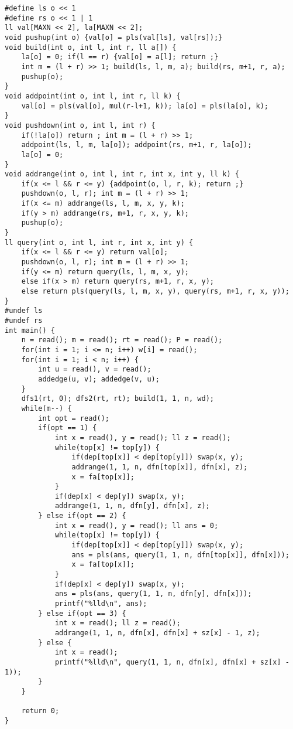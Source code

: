 \documentclass{article}
\begin{document}
\begin{lstlisting}
#define ls o << 1
#define rs o << 1 | 1
ll val[MAXN << 2], la[MAXN << 2];
void pushup(int o) {val[o] = pls(val[ls], val[rs]);}
void build(int o, int l, int r, ll a[]) {
	la[o] = 0; if(l == r) {val[o] = a[l]; return ;}
	int m = (l + r) >> 1; build(ls, l, m, a); build(rs, m+1, r, a);
	pushup(o);
}
void addpoint(int o, int l, int r, ll k) {
	val[o] = pls(val[o], mul(r-l+1, k)); la[o] = pls(la[o], k);
}
void pushdown(int o, int l, int r) {
	if(!la[o]) return ; int m = (l + r) >> 1;
	addpoint(ls, l, m, la[o]); addpoint(rs, m+1, r, la[o]);
	la[o] = 0;
}
void addrange(int o, int l, int r, int x, int y, ll k) {
	if(x <= l && r <= y) {addpoint(o, l, r, k); return ;}
	pushdown(o, l, r); int m = (l + r) >> 1;
	if(x <= m) addrange(ls, l, m, x, y, k);
	if(y > m) addrange(rs, m+1, r, x, y, k);
	pushup(o);
}
ll query(int o, int l, int r, int x, int y) {
	if(x <= l && r <= y) return val[o];
	pushdown(o, l, r); int m = (l + r) >> 1;
	if(y <= m) return query(ls, l, m, x, y);
	else if(x > m) return query(rs, m+1, r, x, y);
	else return pls(query(ls, l, m, x, y), query(rs, m+1, r, x, y));
}
#undef ls
#undef rs
int main() {
	n = read(); m = read(); rt = read(); P = read();
	for(int i = 1; i <= n; i++) w[i] = read();
	for(int i = 1; i < n; i++) {
		int u = read(), v = read();
		addedge(u, v); addedge(v, u);
	}
	dfs1(rt, 0); dfs2(rt, rt); build(1, 1, n, wd);
	while(m--) {
		int opt = read();
		if(opt == 1) {
			int x = read(), y = read(); ll z = read();
			while(top[x] != top[y]) {
				if(dep[top[x]] < dep[top[y]]) swap(x, y);
				addrange(1, 1, n, dfn[top[x]], dfn[x], z);
				x = fa[top[x]];
			}
			if(dep[x] < dep[y]) swap(x, y);
			addrange(1, 1, n, dfn[y], dfn[x], z);
		} else if(opt == 2) {
			int x = read(), y = read(); ll ans = 0;
			while(top[x] != top[y]) {
				if(dep[top[x]] < dep[top[y]]) swap(x, y);
				ans = pls(ans, query(1, 1, n, dfn[top[x]], dfn[x]));
				x = fa[top[x]];
			}
			if(dep[x] < dep[y]) swap(x, y);
			ans = pls(ans, query(1, 1, n, dfn[y], dfn[x]));
			printf("%lld\n", ans);
		} else if(opt == 3) {
			int x = read(); ll z = read();
			addrange(1, 1, n, dfn[x], dfn[x] + sz[x] - 1, z);
		} else {
			int x = read();
			printf("%lld\n", query(1, 1, n, dfn[x], dfn[x] + sz[x] - 1));
		}
	}

	return 0;
}
   \end{lstlisting}
\end{document}
